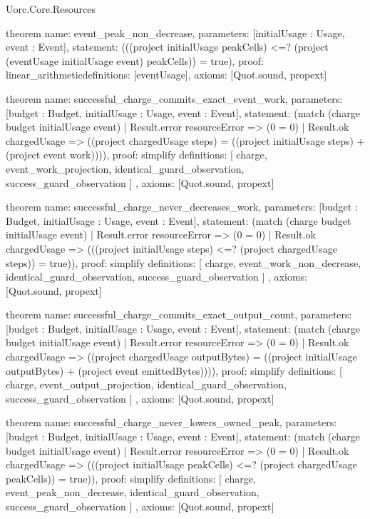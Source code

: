 \begin{lexlean}{Uorc.Core.Resources}
\begin{semanticmodule}
theorem{
  name: event_peak_non_decrease,
  parameters: [initialUsage : Usage, event : Event],
  statement: (((project initialUsage peakCells) <=? (project (eventUsage initialUsage event) peakCells)) = true),
  proof: linear_arithmetic{definitions: [eventUsage]},
  axioms: [Quot.sound, propext]
}

theorem{
  name: successful_charge_commits_exact_event_work,
  parameters: [budget : Budget, initialUsage : Usage, event : Event],
  statement: (match (charge budget initialUsage event)
    | Result.error resourceError => (0 = 0)
    | Result.ok chargedUsage => ((project chargedUsage steps) = ((project initialUsage steps) + (project event work)))),
  proof: simplify{
    definitions: [
      charge,
      event_work_projection,
      identical_guard_observation,
      success_guard_observation
    ]
  },
  axioms: [Quot.sound, propext]
}

theorem{
  name: successful_charge_never_decreases_work,
  parameters: [budget : Budget, initialUsage : Usage, event : Event],
  statement: (match (charge budget initialUsage event)
    | Result.error resourceError => (0 = 0)
    | Result.ok chargedUsage => (((project initialUsage steps) <=? (project chargedUsage steps)) = true)),
  proof: simplify{
    definitions: [
      charge,
      event_work_non_decrease,
      identical_guard_observation,
      success_guard_observation
    ]
  },
  axioms: [Quot.sound, propext]
}

theorem{
  name: successful_charge_commits_exact_output_count,
  parameters: [budget : Budget, initialUsage : Usage, event : Event],
  statement: (match (charge budget initialUsage event)
    | Result.error resourceError => (0 = 0)
    | Result.ok chargedUsage => ((project chargedUsage outputBytes) = ((project initialUsage outputBytes) + (project event emittedBytes)))),
  proof: simplify{
    definitions: [
      charge,
      event_output_projection,
      identical_guard_observation,
      success_guard_observation
    ]
  },
  axioms: [Quot.sound, propext]
}

theorem{
  name: successful_charge_never_lowers_owned_peak,
  parameters: [budget : Budget, initialUsage : Usage, event : Event],
  statement: (match (charge budget initialUsage event)
    | Result.error resourceError => (0 = 0)
    | Result.ok chargedUsage => (((project initialUsage peakCells) <=? (project chargedUsage peakCells)) = true)),
  proof: simplify{
    definitions: [
      charge,
      event_peak_non_decrease,
      identical_guard_observation,
      success_guard_observation
    ]
  },
  axioms: [Quot.sound, propext]
}
\end{semanticmodule}
\end{lexlean}
